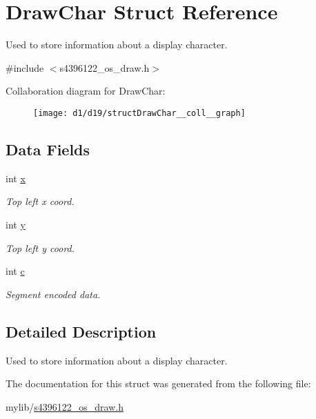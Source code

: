 \hypertarget{structDrawChar}{}\section{Draw\+Char Struct Reference}
\label{structDrawChar}


Used to store information about a display character.  




{\ttfamily \#include $<$s4396122\+\_\+os\+\_\+draw.\+h$>$}



Collaboration diagram for Draw\+Char\+:\nopagebreak
\begin{figure}[H]
\begin{center}
\leavevmode
\texttt{[image: d1/d19/structDrawChar\_\_coll\_\_graph]}
\end{center}
\end{figure}
\subsection*{Data Fields}
\begin{DoxyCompactItemize}
\item 
int \hyperlink{structDrawChar_adc9ce5763c5a78e7b6e524bfacbb3bc9}{x}\hypertarget{structDrawChar_adc9ce5763c5a78e7b6e524bfacbb3bc9}{}\label{structDrawChar_adc9ce5763c5a78e7b6e524bfacbb3bc9}

\begin{DoxyCompactList}\small\item\em Top left x coord. \end{DoxyCompactList}\item 
int \hyperlink{structDrawChar_a49c68b3c5623c02c534bcd9fed6eec52}{y}\hypertarget{structDrawChar_a49c68b3c5623c02c534bcd9fed6eec52}{}\label{structDrawChar_a49c68b3c5623c02c534bcd9fed6eec52}

\begin{DoxyCompactList}\small\item\em Top left y coord. \end{DoxyCompactList}\item 
int \hyperlink{structDrawChar_ae987c60819064d44007ab101a71d2cd6}{c}\hypertarget{structDrawChar_ae987c60819064d44007ab101a71d2cd6}{}\label{structDrawChar_ae987c60819064d44007ab101a71d2cd6}

\begin{DoxyCompactList}\small\item\em Segment encoded data. \end{DoxyCompactList}\end{DoxyCompactItemize}


\subsection{Detailed Description}
Used to store information about a display character. 

The documentation for this struct was generated from the following file\+:\begin{DoxyCompactItemize}
\item 
mylib/\hyperlink{s4396122__os__draw_8h}{s4396122\+\_\+os\+\_\+draw.\+h}\end{DoxyCompactItemize}

